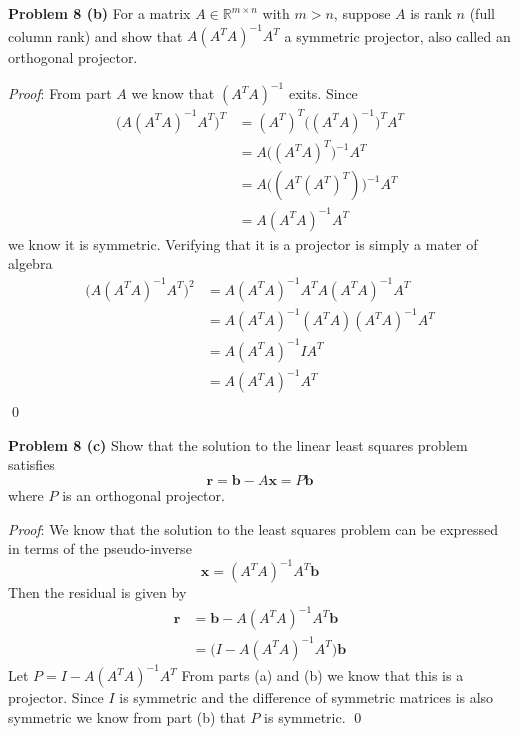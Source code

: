 \documentclass[12pt]{article}
\newcommand{\problem}[1]{\hspace{-4 ex} \large \textbf{Problem #1} }
\renewenvironment{proof}{\hspace{-4 ex} \emph{Proof}:}{\qed}
\newcommand{\RR}{\mathbb{R}}
\begin{document}
\bigbreak

\problem{8 (b)} For a matrix $A \in \RR^{m \times n}$ with $m>n$, suppose $A$ is rank $n$ (full column rank) and show that $A(A^TA)^{-1}A^T$ a symmetric projector, also called an orthogonal projector.

\begin{proof}
	From part $A$ we know that $(A^TA)^{-1}$ exits. Since
	\begin{align*}
		\big( A(A^TA)^{-1}A^T \big)^T & = (A^T)^T \big( (A^TA)^{-1} \big)^T A^T \\
		& = A \big( (A^TA)^{T} \big)^{-1} A^T \\
		& = A \big( (A^T(A^T)^T) \big)^{-1} A^T \\
		& = A(A^TA)^{-1}A^T
	\end{align*}
	we know it is symmetric. Verifying that it is a projector is simply a mater of algebra
	\begin{align*}
		\big( A(A^TA)^{-1}A^T \big)^2 & = A(A^TA)^{-1}A^T A(A^TA)^{-1}A^T \\
		& = A(A^TA)^{-1} (A^T A) (A^TA)^{-1}A^T \\
		& = A(A^TA)^{-1} I A^T \\
		& = A(A^TA)^{-1} A^T \\
	\end{align*}
\end{proof}

\bigbreak

\problem{8 (c)} Show that the solution to the linear least squares problem satisfies
$$
\mathbf{r} = \mathbf{b} - A \mathbf{x} = P \mathbf{b}
$$
where $P$ is an orthogonal projector.

\begin{proof}
	We know that the solution to the least squares problem can be expressed in terms of the pseudo-inverse
	$$
		\mathbf{x} = (A^TA)^{-1}A^T \mathbf{b}
	$$
	Then the residual is given by
	\begin{align*}
		\mathbf{r} & = \mathbf{b} - A (A^TA)^{-1}A^T \mathbf{b} \\
		& = \big( I - A (A^TA)^{-1}A^T \big) \mathbf{b}
	\end{align*}
	Let $P = I - A (A^TA)^{-1}A^T$ From parts (a) and (b) we know that this is a projector. Since $I$ is symmetric and the difference of symmetric matrices is also symmetric we know from part (b) that $P$ is symmetric.
\end{proof}
\end{document}
